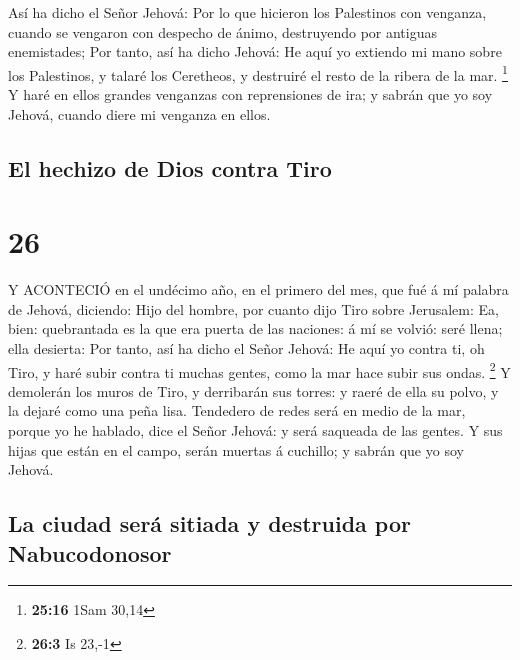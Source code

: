  Así ha dicho el Señor Jehová: Por lo que hicieron los
Palestinos con venganza, cuando se vengaron con despecho de ánimo,
destruyendo por antiguas enemistades;  Por tanto, así ha
dicho Jehová: He aquí yo extiendo mi mano sobre los Palestinos, y talaré
los Ceretheos, y destruiré el resto de la ribera de la mar. \footnote{\textbf{25:16}
  1Sam 30,14}  Y haré en ellos grandes venganzas con
reprensiones de ira; y sabrán que yo soy Jehová, cuando diere mi
venganza en ellos.

\hypertarget{el-hechizo-de-dios-contra-tiro}{%
\subsection{El hechizo de Dios contra
Tiro}\label{el-hechizo-de-dios-contra-tiro}}

\hypertarget{section-25}{%
\section{26}\label{section-25}}

 Y ACONTECIÓ en el undécimo año, en el primero del mes, que
fué á mí palabra de Jehová, diciendo:  Hijo del hombre, por
cuanto dijo Tiro sobre Jerusalem: Ea, bien: quebrantada es la que era
puerta de las naciones: á mí se volvió: seré llena; ella desierta:
 Por tanto, así ha dicho el Señor Jehová: He aquí yo contra
ti, oh Tiro, y haré subir contra ti muchas gentes, como la mar hace
subir sus ondas. \footnote{\textbf{26:3} Is 23,-1}  Y
demolerán los muros de Tiro, y derribarán sus torres: y raeré de ella su
polvo, y la dejaré como una peña lisa.  Tendedero de redes
será en medio de la mar, porque yo he hablado, dice el Señor Jehová: y
será saqueada de las gentes.  Y sus hijas que están en el
campo, serán muertas á cuchillo; y sabrán que yo soy Jehová.

\hypertarget{la-ciudad-seruxe1-sitiada-y-destruida-por-nabucodonosor}{%
\subsection{La ciudad será sitiada y destruida por
Nabucodonosor}\label{la-ciudad-seruxe1-sitiada-y-destruida-por-nabucodonosor}}

